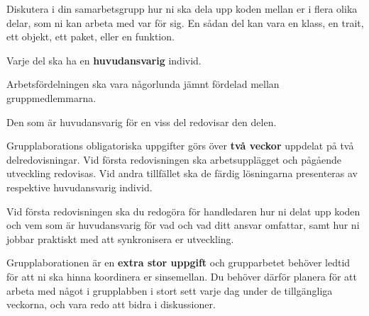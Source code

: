 \item
Diskutera i din samarbetsgrupp hur ni ska dela upp koden mellan er i flera olika delar, som ni kan arbeta med var för sig. En sådan del kan vara en klass, en trait, ett objekt, ett paket, eller en funktion.
\item
Varje del ska ha en \textbf{huvudansvarig} individ.
\item
Arbetsfördelningen ska vara någorlunda jämnt fördelad mellan gruppmedlemmarna.
\item
Den som är huvudansvarig för en viss del redovisar den delen.
\item
Grupplaborations obligatoriska uppgifter görs över \textbf{två veckor} uppdelat på två delredovisningar. Vid första redovisningen ska arbetsupplägget och pågående utveckling redovisas. Vid andra tillfället ska de färdig lösningarna presenteras av respektive huvudansvarig individ.
\item
Vid första redovisningen ska du redogöra för handledaren hur ni delat upp koden och vem som är huvudansvarig för vad och vad ditt ansvar omfattar, samt hur ni jobbar praktiskt med att synkronisera er utveckling.
\item Grupplaborationen är en \textbf{extra stor uppgift} och grupparbetet behöver ledtid för att ni ska hinna koordinera er sinsemellan. Du behöver därför planera för att arbeta med något i grupplabben i stort sett varje dag under de tillgängliga veckorna, och vara redo att bidra i diskussioner.
